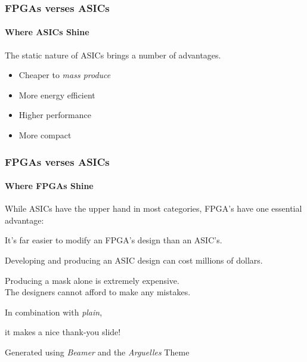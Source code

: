 \documentclass{beamer}
\begin{document}
  
  \begin{frame}
    \frametitle{FPGAs verses ASICs}
    \framesubtitle{Where ASICs Shine}

    The static nature of ASICs brings a number of advantages.

    \vfill
    
    \begin{itemize}
      \item Cheaper to \textit{mass produce}
      \item More energy efficient
      \item Higher performance
      \item More compact
    \end{itemize}

  \end{frame}

  \begin{frame}
    \frametitle{FPGAs verses ASICs}
    \framesubtitle{Where FPGAs Shine}

    \AlegreyaSansMedium While ASICs have the upper hand in most categories, FPGA's have
    one essential advantage:

    \vfill
    
    \AlegreyaBlack It's far easier to modify an FPGA's design than an ASIC's.
    
    \vfill
      
    \AlegreyaSansMedium Developing and producing an ASIC design can cost \AlegreyaBlack
    millions of dollars. \\
    
    \vfill
    
    \AlegreyaSansMedium Producing a mask alone is extremely expensive. \\
    The designers cannot afford to make any mistakes. \\

  \end{frame}

   
  \ThankYou
  \begin{frame}
    In combination with \textit{plain},\par
    it makes a nice thank-you slide!

    \vfill{Generated using \textit{Beamer} and the \textit{Arguelles} Theme}
  \end{frame}
\end{document}
